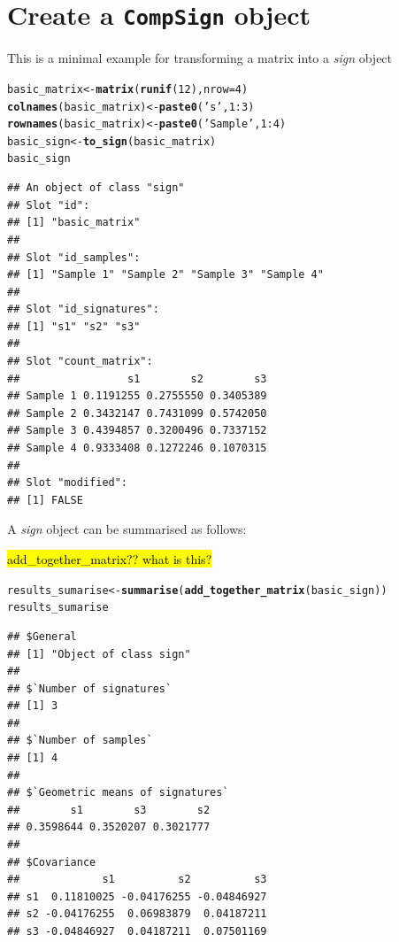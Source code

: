 \documentclass{article}\usepackage[]{graphicx}\usepackage[]{color}
\makeatletter
\newcommand{\hlnum}[1]{\textcolor[rgb]{0.686,0.059,0.569}{#1}}%
\newcommand{\hlstr}[1]{\textcolor[rgb]{0.192,0.494,0.8}{#1}}%
\newcommand{\hlopt}[1]{\textcolor[rgb]{0,0,0}{#1}}%
\newcommand{\hlstd}[1]{\textcolor[rgb]{0.345,0.345,0.345}{#1}}%
\newcommand{\hlkwb}[1]{\textcolor[rgb]{0.69,0.353,0.396}{#1}}%
\newcommand{\hlkwc}[1]{\textcolor[rgb]{0.333,0.667,0.333}{#1}}%
\newcommand{\hlkwd}[1]{\textcolor[rgb]{0.737,0.353,0.396}{\textbf{#1}}}%
\newenvironment{kframe}{%
 \def\at@end@of@kframe{}%
 \ifinner\ifhmode%
  \def\at@end@of@kframe{\end{minipage}}%
  \begin{minipage}{\columnwidth}%
 \fi\fi%
 \def\FrameCommand##1{\hskip\@totalleftmargin \hskip-\fboxsep
 \colorbox{shadecolor}{##1}\hskip-\fboxsep
     \hskip-\linewidth \hskip-\@totalleftmargin \hskip\columnwidth}%
 \MakeFramed {\advance\hsize-\width
   \@totalleftmargin\z@ \linewidth\hsize
   \@setminipage}}%
 {\par\unskip\endMakeFramed%
 \at@end@of@kframe}
\newenvironment{knitrout}{}{} %
\makeatother
\begin{document}
\section{Create a \texttt{CompSign} object}
This is a minimal example for transforming a matrix into a \emph{sign} object
\begin{knitrout}
\color{fgcolor}\begin{kframe}
\begin{alltt}
\hlstd{basic_matrix} \hlkwb{<-} \hlkwd{matrix}\hlstd{(}\hlkwd{runif}\hlstd{(}\hlnum{12}\hlstd{),} \hlkwc{nrow} \hlstd{=} \hlnum{4}\hlstd{)}
\hlkwd{colnames}\hlstd{(basic_matrix)} \hlkwb{<-} \hlkwd{paste0}\hlstd{(}\hlstr{'s'}\hlstd{,} \hlnum{1}\hlopt{:}\hlnum{3}\hlstd{)}
\hlkwd{rownames}\hlstd{(basic_matrix)} \hlkwb{<-} \hlkwd{paste0}\hlstd{(}\hlstr{'Sample '}\hlstd{,} \hlnum{1}\hlopt{:}\hlnum{4}\hlstd{)}
\hlstd{basic_sign} \hlkwb{<-} \hlkwd{to_sign}\hlstd{(basic_matrix)}
\hlstd{basic_sign}
\end{alltt}
\begin{verbatim}
## An object of class "sign"
## Slot "id":
## [1] "basic_matrix"
## 
## Slot "id_samples":
## [1] "Sample 1" "Sample 2" "Sample 3" "Sample 4"
## 
## Slot "id_signatures":
## [1] "s1" "s2" "s3"
## 
## Slot "count_matrix":
##                 s1        s2        s3
## Sample 1 0.1191255 0.2755550 0.3405389
## Sample 2 0.3432147 0.7431099 0.5742050
## Sample 3 0.4394857 0.3200496 0.7337152
## Sample 4 0.9333408 0.1272246 0.1070315
## 
## Slot "modified":
## [1] FALSE
\end{verbatim}
\end{kframe}
\end{knitrout}

A \emph{sign} object can be summarised as follows:

\hl{add\_together\_matrix?? what is this?}

\begin{knitrout}
\color{fgcolor}\begin{kframe}
\begin{alltt}
\hlstd{results_sumarise} \hlkwb{<-} \hlkwd{summarise}\hlstd{(}\hlkwd{add_together_matrix}\hlstd{(basic_sign))}
\hlstd{results_sumarise}
\end{alltt}
\begin{verbatim}
## $General
## [1] "Object of class sign"
## 
## $`Number of signatures`
## [1] 3
## 
## $`Number of samples`
## [1] 4
## 
## $`Geometric means of signatures`
##        s1        s3        s2 
## 0.3598644 0.3520207 0.3021777 
## 
## $Covariance
##             s1          s2          s3
## s1  0.11810025 -0.04176255 -0.04846927
## s2 -0.04176255  0.06983879  0.04187211
## s3 -0.04846927  0.04187211  0.07501169
\end{verbatim}
\end{kframe}
\end{knitrout}
\end{document}
